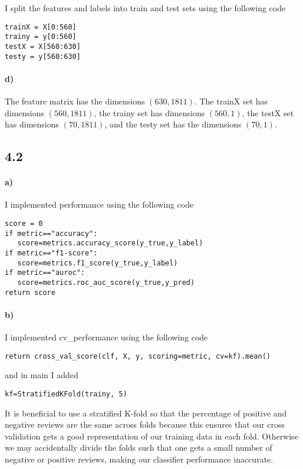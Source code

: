 \documentclass[12pt]{article}
\begin{document}
I split the features and labels into train and test sets using the following code
\begin{verbatim}
trainX = X[0:560]
trainy = y[0:560]
testX = X[560:630]
testy = y[560:630]
\end{verbatim}

\paragraph{d)}

The feature matrix has the dimensions \((630,1811)\). The trainX set has dimensions \((560,1811)\), the trainy set has
dimensions \((560,1)\), the testX set has dimensions \((70,1811)\), and the testy set has the dimensions \((70,1)\).

\subsection*{4.2}

\paragraph{a)}

I implemented performance using the following code
\begin{verbatim}
score = 0
if metric=="accuracy":
   score=metrics.accuracy_score(y_true,y_label)
if metric=="f1-score":
   score=metrics.f1_score(y_true,y_label)
if metric=="auroc":
   score=metrics.roc_auc_score(y_true,y_pred)
return score
\end{verbatim}

\paragraph{b)}

I implemented cv\_performance using the following code
\begin{verbatim}
return cross_val_score(clf, X, y, scoring=metric, cv=kf).mean()
\end{verbatim}
and in main I added
\begin{verbatim}
kf=StratifiedKFold(trainy, 5)
\end{verbatim}
It is beneficial to use a stratified K-fold so that the percentage of positive and negative reviews are the same across folds
because this ensures that our cross validation gets a good representation of our training data in each fold. Otherwise
we may accidentally divide the folds such that one gets a small number of negative or positive reviews, making our classifier
performance inaccurate.
\end{document}
